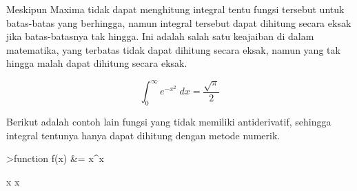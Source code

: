 \documentclass[12pt,arial,letterpaper]{book}
\begin{document}
\begin{eulernootebook}
\begin{eulercomment}
\begin{eulercomment}
\begin{eulernootebook}
\begin{eulercomment}
\begin{eulercomment}
\begin{eulercomment}
\begin{eulercomment}
\begin{eulercomment}
\begin{eulercomment}
\begin{eulernotebook}
\begin{eulercomment}
\begin{eulercomment}
\begin{eulercomment}
\begin{eulercomment}
\begin{eulercomment}
\begin{eulercomment}
\begin{eulercomment}
\begin{eulercomment}
\begin{eulercomment}
Meskipun Maxima tidak dapat menghitung integral tentu fungsi tersebut
untuk batas-batas yang berhingga, namun integral tersebut dapat
dihitung secara eksak jika batas-batasnya tak hingga. Ini adalah salah
satu keajaiban di dalam matematika, yang terbatas tidak dapat dihitung
secara eksak, namun yang tak hingga malah dapat dihitung secara eksak.
\end{eulercomment}
\begin{eulerformula}
\[
\int_{0}^{\infty }{e^ {- x^2 }\;dx}=\frac{\sqrt{\pi}}{2}
\]
\end{eulerformula}
\begin{eulercomment}
Berikut adalah contoh lain fungsi yang tidak memiliki antiderivatif,
sehingga integral tentunya hanya dapat dihitung dengan metode numerik.
\end{eulercomment}
\begin{eulerprompt}
>function f(x) &= x^x
\end{eulerprompt}
\begin{euleroutput}
  
                                     x
                                    x
  

\end{euleroutput}
\end{eulercomment}
\end{eulercomment}
\end{eulercomment}
\end{eulercomment}
\end{eulercomment}
\end{eulercomment}
\end{eulercomment}
\end{eulercomment}
\end{eulernotebook}
\end{eulercomment}
\end{eulercomment}
\end{eulercomment}
\end{eulercomment}
\end{eulercomment}
\end{eulercomment}
\end{eulernootebook}
\end{eulercomment}
\end{eulercomment}
\end{eulernootebook}
\end{document}

